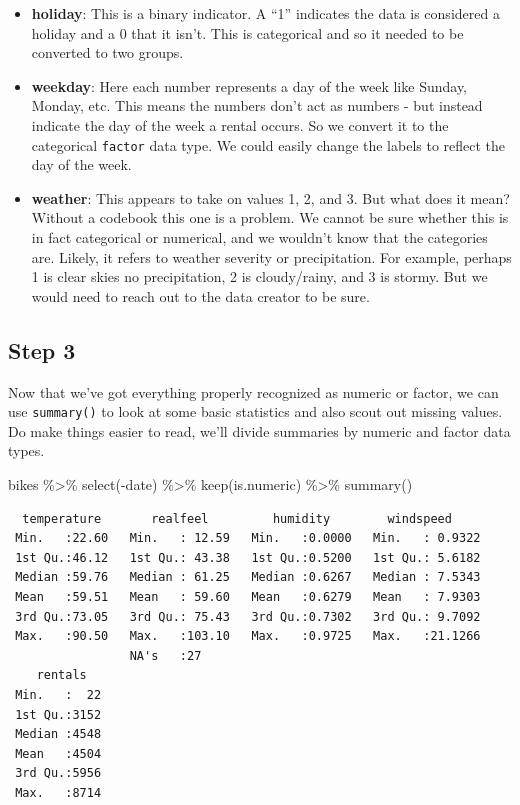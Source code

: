 \documentclass[
  letterpaper,
  DIV=11,
  numbers=noendperiod]{scrartcl}
\newenvironment{Shaded}{\begin{snugshade}}{\end{snugshade}}
\newcommand{\FunctionTok}[1]{\textcolor[rgb]{0.28,0.35,0.67}{#1}}
\newcommand{\NormalTok}[1]{\textcolor[rgb]{0.00,0.23,0.31}{#1}}
\newcommand{\SpecialCharTok}[1]{\textcolor[rgb]{0.37,0.37,0.37}{#1}}
\begin{document}
\begin{itemize}
\item
  \textbf{holiday}: This is a binary indicator. A ``1'' indicates the
  data is considered a holiday and a 0 that it isn't. This is
  categorical and so it needed to be converted to two groups.
\item
  \textbf{weekday}: Here each number represents a day of the week like
  Sunday, Monday, etc. This means the numbers don't act as numbers - but
  instead indicate the day of the week a rental occurs. So we convert it
  to the categorical \texttt{factor} data type. We could easily change
  the labels to reflect the day of the week.
\item
  \textbf{weather}: This appears to take on values 1, 2, and 3. But what
  does it mean? Without a codebook this one is a problem. We cannot be
  sure whether this is in fact categorical or numerical, and we wouldn't
  know that the categories are. Likely, it refers to weather severity or
  precipitation. For example, perhaps 1 is clear skies no precipitation,
  2 is cloudy/rainy, and 3 is stormy. But we would need to reach out to
  the data creator to be sure.
\end{itemize}

\hypertarget{step-3}{%
\subsection{Step 3}\label{step-3}}

Now that we've got everything properly recognized as numeric or factor,
we can use \texttt{summary()} to look at some basic statistics and also
scout out missing values. Do make things easier to read, we'll divide
summaries by numeric and factor data types.

\begin{Shaded}
\begin{Highlighting}[]
\NormalTok{bikes }\SpecialCharTok{\%\textgreater{}\%}
  \FunctionTok{select}\NormalTok{(}\SpecialCharTok{{-}}\NormalTok{date) }\SpecialCharTok{\%\textgreater{}\%}
  \FunctionTok{keep}\NormalTok{(is.numeric) }\SpecialCharTok{\%\textgreater{}\%}
  \FunctionTok{summary}\NormalTok{()}
\end{Highlighting}
\end{Shaded}

\begin{verbatim}
  temperature       realfeel         humidity        windspeed      
 Min.   :22.60   Min.   : 12.59   Min.   :0.0000   Min.   : 0.9322  
 1st Qu.:46.12   1st Qu.: 43.38   1st Qu.:0.5200   1st Qu.: 5.6182  
 Median :59.76   Median : 61.25   Median :0.6267   Median : 7.5343  
 Mean   :59.51   Mean   : 59.60   Mean   :0.6279   Mean   : 7.9303  
 3rd Qu.:73.05   3rd Qu.: 75.43   3rd Qu.:0.7302   3rd Qu.: 9.7092  
 Max.   :90.50   Max.   :103.10   Max.   :0.9725   Max.   :21.1266  
                 NA's   :27                                         
    rentals    
 Min.   :  22  
 1st Qu.:3152  
 Median :4548  
 Mean   :4504  
 3rd Qu.:5956  
 Max.   :8714  
               
\end{verbatim}
\end{document}
